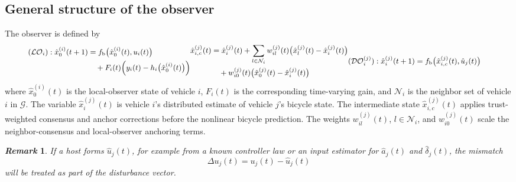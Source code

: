 \documentclass[letterpaper,journal]{IEEEtran}
\def\G{\mathcal{G}} %
\def\N{\mathcal{N}} %
\def\LO{\mathcal{LO}} %
\def\DO{\mathcal{DO}} %
\newtheorem{remark}{\it Remark}%
\begin{document}
\subsection{General structure of the observer}
The observer is defined by
\begin{subequations}\label{eq_observer}
\begin{small}
\begin{align}\label{eq_LO}
(\LO_i): \hat{x}_{0}^{(i)}(t+1)
&= f_{\text{b}}\big(\hat{x}_{0}^{(i)}(t),u_i(t)\big)\notag \\
&\quad + F_i(t)\Big(y_i(t)-h_i\big(\hat{x}_{0}^{(i)}(t)\big)\Big) %
\end{align}
\begin{align}\label{eq_consensus_state}
\hat{x}_{i,c}^{(j)}(t)
&= \hat{x}_i^{(j)}(t)
+\sum_{l \in \N_i} w_{il}^{(j)}(t)
   \big(\hat{x}_l^{(j)}(t)-\hat{x}_i^{(j)}(t)\big)\notag\\
&\quad + w_{i0}^{(j)}(t)
   \big(\hat{x}_0^{(j)}(t)-\hat{x}_i^{(j)}(t)\big)
\end{align}
\begin{align}\label{eq_DO}
(\DO_i^{(j)}): \hat{x}^{(j)}_i(t+1)
&= f_{\text{b}}\big(\hat{x}_{i,c}^{(j)}(t),\hat{u}_j(t)\big) %
\end{align}
\end{small}
\end{subequations}
where $\hat{x}_{0}^{(i)}(t)$ is the local-observer state of vehicle $i$, $F_i(t)$ is the corresponding time-varying gain, and $\N_i$ is the neighbor set of vehicle $i$ in $\G$. The variable $\hat{x}_i^{(j)}(t)$ is vehicle $i$'s distributed estimate of vehicle $j$'s bicycle state. The intermediate state $\hat{x}_{i,c}^{(j)}(t)$ applies trust-weighted consensus and anchor corrections before the nonlinear bicycle prediction. The weights $w_{il}^{(j)}(t)$, $l \in \N_i$, and $w_{i0}^{(j)}(t)$ scale the neighbor-consensus and local-observer anchoring terms. 

\begin{remark}\label{rem1}
If a host forms $\hat{u}_j(t)$, for example from a known controller law or an input estimator for $\hat a_j(t)$ and $\hat\delta_j(t)$, the mismatch
\begin{equation}
    \Delta u_j(t) = u_j(t) - \hat{u}_j(t)
\end{equation}
will be treated as part of the disturbance vector. %
\end{remark}
\end{document}
